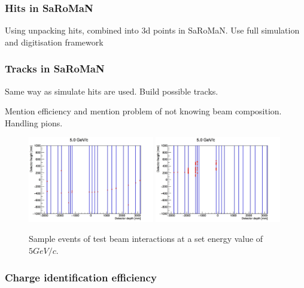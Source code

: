 \subsubsection{Hits in SaRoMaN}
Using unpacking hits, combined into 3d points in SaRoMaN. Use full simulation and digitisation framework


\subsubsection{Tracks in SaRoMaN}
Same way as simulate hits are used. Build possible tracks.


Mention efficiency and mention problem of not knowing beam composition. Handling pions.


\begin{figure}[h!]
\centering
\includegraphics[width=0.49\textwidth]{figures/oldStudies/m5GeVevent2.jpg}
\includegraphics[width=0.49\textwidth]{figures/oldStudies/m5GeVevent3.jpg}
\caption{Sample events of test beam interactions at a set energy value of $5GeV/c$.}
\label{fig:EventsInitial}
\end{figure}

\subsubsection{Charge identification efficiency}

